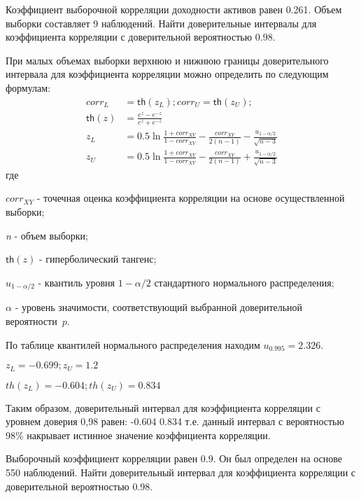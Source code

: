 \documentclass[12pt, table, twoside, a4paper]{exam}
\begin{document}
\setcounter{section}{0\relax}%

\noindent

\normalsize
\begin{questions}
	\question[20] Коэффициент выборочной корреляции доходности активов равен 0.261. Объем выборки составляет 9 наблюдений. Найти доверительные интервалы для коэффициента корреляции с доверительной вероятностью 0.98. 
	
	\begin{solution}[6em]
		
		\raggedright
		При малых объемах выборки верхнюю и нижнюю границы доверительного интервала для коэффициента корреляции можно определить по следующим формулам:
		\begin{align}
		corr_L&=\mathsf{th}(z_L); corr_U=\mathsf{th}(z_U);\\
		\mathsf{th}(z)&=\frac{e^z-e^{-z}}{e^z+e^{-z}}\\
		z_L&=0.5\ln \frac{1+corr_{XY}}{1-corr_{XY}}-\frac{corr_{XY}}{2(n-1)}-\frac{u_{1-\alpha/2}}{\sqrt{n-3}}
		\\
		z_U&=0.5\ln \frac{1+corr_{XY}}{1-corr_{XY}}-\frac{corr_{XY}}{2(n-1)}+\frac{u_{1-\alpha/2}}{\sqrt{n-3}}
		\end{align}
		где
		
		$corr_{XY}$ - точечная оценка коэффициента корреляции на основе осуществленной выборки;
		
		\textit{n} - объем выборки;
		
		$\mathsf{th}(z)$ - гиперболический тангенс;
		
		$u_{1-\alpha/2}$ - квантиль уровня $1-\alpha/2$ стандартного нормального распределения;
		
		$\alpha$ - уровень значимости, соответствующий выбранной доверительной вероятности~$p$.
		
		По таблице квантилей нормального распределения находим $u_{0.995}=2.326$.
		
		$z_L=-0.699; z_U=1.2$
		
		$th(z_L)=-0.604; th(z_U)=0.834$
		
		Таким образом, доверительный интервал для коэффициента корреляции с уровнем доверия 0,98 равен: -0.604 0.834 т.е. данный интервал с вероятностью 98\% накрывает истинное значение коэффициента корреляции.
	\end{solution}
	
	\question[10] Выборочный коэффициент корреляции равен 0.9. Он был определен на основе 550 наблюдений. Найти доверительный интервал для коэффициента корреляции с доверительной вероятностью 0.98.
	

\end{questions}
\end{document}
